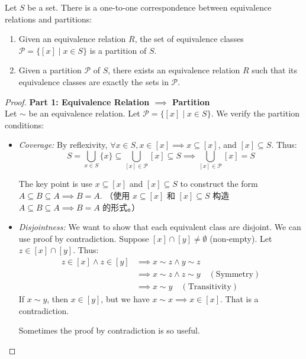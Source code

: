 \documentclass[
	UTF-8,
	11pt, %
	a4paper, %
]{LegrandOrangeBook}
\begin{document}
\newpage


\begin{theorem}
Let $S$ be a set. There is a one-to-one correspondence between equivalence relations and partitions:
\begin{enumerate}
    \item Given an equivalence relation $R$, the set of equivalence classes $\mathcal{P} = \{[x] \mid x \in S\}$ is a partition of $S$.
    \item Given a partition $\mathcal{P}$ of $S$, there exists an equivalence relation $R$ such that its equivalence classes are exactly the sets in $\mathcal{P}$.
\end{enumerate}
\end{theorem}

\begin{proof}
\textbf{Part 1: Equivalence Relation $\implies$ Partition} \\
Let $\sim$ be an equivalence relation. Let $\mathcal{P} = \{ [x] \mid x \in S \}$. 
We verify the partition conditions:
\begin{itemize}
    \item \textit{Coverage:} By reflexivity, $\forall x \in S, x \in [x] \implies {x} \subseteq [x] $, 
	and $[x] \subseteq S$. Thus:
    $$ S = \bigcup_{x \in S} \{x\} \subseteq \bigcup_{[x] \in \mathcal{P}} [x] \subseteq S \implies \bigcup_{[x] \in \mathcal{P}} [x] =S $$
    
	\begin{remark}
		The key point is use $ {x} \subseteq [x]$ and $[x] \subseteq S$ to construct the form $A \subseteq B \subseteq A \implies B=A$. 
		（使用 $ {x} \subseteq [x]$ 和 $[x] \subseteq S$ 构造 $A \subseteq B \subseteq A \implies B=A$ 的形式。）
	\end{remark}

    \item \textit{Disjointness:} We want to show that each equivalent class are disjoint. 
    We can use proof by contradiction. Suppose $[x] \cap [y] \neq \emptyset$ (non-empty). 
	Let $z \in [x] \cap [y]$. Thus:
    \begin{align*}
        z \in [x] \land z \in [y] &\implies x \sim z \land y \sim z \\
        &\implies x \sim z \land z \sim y \quad (\text{Symmetry}) \\
        &\implies x \sim y \quad (\text{Transitivity})
    \end{align*}
    If $x \sim y$, then $x \in [y]$, but we have $x \sim x \implies x \in [x]$. That is a contradiction.
	\begin{remark}
		Sometimes the proof by contradiction is so useful.
	\end{remark}
\end{itemize}


\end{proof}
\end{document}
